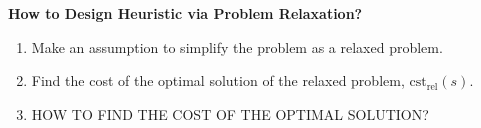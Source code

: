 \begin{process} \textbf{How to Design Heuristic via Problem Relaxation?}
    \begin{enumerate}
        \item Make an assumption to simplify the problem as a relaxed problem. 
        \item Find the cost of the optimal solution of the relaxed problem, $\text{cst}_{\text{rel}}(s)$.
        \item HOW TO FIND THE COST OF THE OPTIMAL SOLUTION?
    \end{enumerate}
\end{process}

\begin{example}
\end{example}








